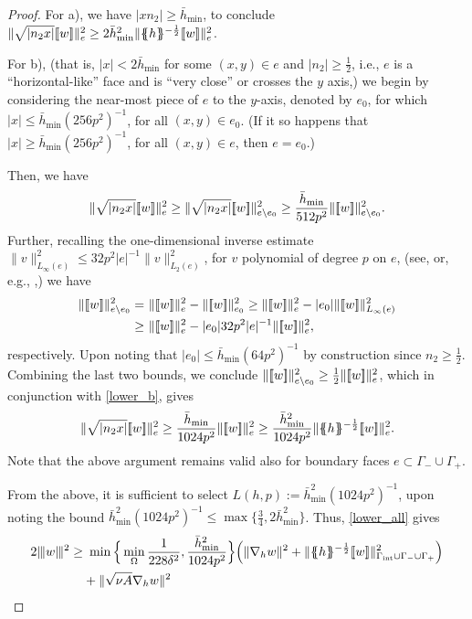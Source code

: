 \documentclass{amsart}
\newcommand{\norm}[2]{\|{#1}\|_{{#2}}}
\newcommand{\jump}[1]{[\kern-0.6mm [{#1}]\kern-0.6mm]}
\newcommand{\av}[1]{\{\kern-1.2mm \{{#1}\}\kern-1.2mm\}}
\newcommand{\gint}{\Gamma_{\rm int}}
\newcommand{\gif}{\Gamma_-}
\newcommand{\ndg}[1]{|\kern-.03cm \|{#1}|\kern-.03cm \|}
\newcommand{\avg }[1]{ \av{ #1}}
\newcommand{\barhmin}{\bar{h}_{\min}}
\theoremstyle{definition}
\theoremstyle{remark}
\numberwithin{equation}{section}
\begin{document}
\begin{proof}
For a), we have $|xn_2|\ge \barhmin$, to conclude $\norm{\sqrt{|n_2 x|}\jump{w}}{e }^2\ge 2 \barhmin^2\norm{\avg{h}^{-\frac{1}{2}}\jump{w}}{e}^2$.

For b), (that is, $|x|< 2\barhmin$ for some $(x,y)\in e$ and $|n_2|\ge \frac{1}{2}$, i.e., $e$ is a ``horizontal-like'' face and is ``very close'' or crosses the $y$ axis,) we begin by considering the near-most piece of $e$ to the $y$-axis, denoted by $e_0$,
 for which
$ |x|
\le  \barhmin(256p^2)^{-1}$, for all $(x,y)\in e_0$. (If it so happens that $ |x|
\ge  \barhmin(256p^2)^{-1}$, for all $(x,y)\in e$, then $e=e_0$.)

Then, we have
\begin{equation}\label{lower_b}
\norm{\sqrt{|n_2 x|}\jump{w}}{e}^2\ge  \norm{\sqrt{|n_2 x|}\jump{w}}{e\backslash e_0}^2 \ge \frac{\barhmin}{512p^2}\norm{\jump{w}}{e\backslash e_0}^2.
\end{equation}
Further, recalling the one-dimensional inverse estimate $\norm{v}{L_\infty(e)}^2\le 32p^2|e|^{-1}\norm{v}{L_2(e)}^2$, for $v$ polynomial of degree $p$ on $e$, (see, \cite{MR839312} or, e.g., \cite[Eq.~(3.6.4)]{schwab},) we have
\[
\begin{aligned}
\norm{\jump{w}}{e\backslash e_0}^2
= &\
\norm{\jump{w}}{e}^2-\norm{\jump{w}}{e_0}^2
\ge
\norm{\jump{w}}{e}^2-|e_0|\norm{\jump{w}}{L_\infty(e)}^2\\
\ge &\
\norm{\jump{w}}{e}^2-|e_0|32p^2 |e|^{-1}\norm{\jump{w}}{e}^2,
\end{aligned}
\]
respectively.  Upon noting that  $|e_0|\le \barhmin(64p^2)^{-1}$ by construction since $n_2\ge \frac{1}{2}$.
 Combining the last two bounds, we conclude $\norm{\jump{w}}{e\backslash e_0}^2 \ge \frac{1}{2}\norm{\jump{w}}{e}^2$, which in conjunction with \eqref{lower_b}, gives
 \[
 \norm{\sqrt{|n_2 x|}\jump{w}}{e}^2\ge \frac{\barhmin}{1024 p^2}\norm{\jump{w}}{e}^2\ge \frac{\barhmin^2}{1024 p^2}\norm{\avg{h}^{-\frac{1}{2}}\jump{w}}{e}^2.
 \]
 Note that the above argument remains valid also for boundary faces $e\subset \gif\cup\Gamma_+$.

  From the above, it is sufficient to select
$
 L(h,p):= \barhmin^2(1024p^2)^{-1}
$,
upon noting the bound $\barhmin^2(1024p^2)^{-1}\le \max\{\frac{3}{4},2\barhmin^2\}$. Thus, \eqref{lower_all} gives
\[
\begin{aligned}
2	\ndg{w}^2\ge &\   \min\Big \{\min_\Omega\frac{1}{228\delta^2},  \frac{\barhmin^2}{1024p^2}\Big\} \Big( \norm{\nabla_h w}{}^2 +\norm{\avg{h}^{-\frac{1}{2}}\jump{w}}{\gint \cup\gif\cup\Gamma_+}^2 \Big)\\
&+\norm{\sqrt{\nu A}\nabla _hw}{}^2
\end{aligned}
\]



\end{proof}
\end{document}
